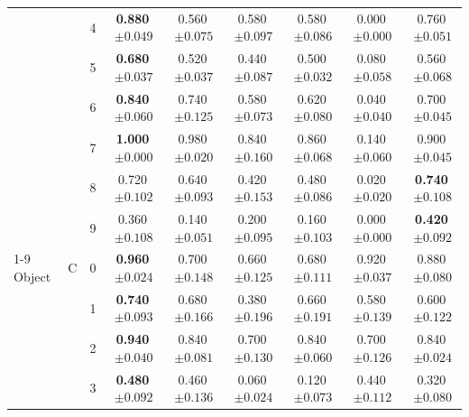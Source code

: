 \begin{longtable}{lllcccccc}
 &  & 4 & \textbf{0.880}$\,{\scriptstyle\pm0.049}$ & 0.560$\,{\scriptstyle\pm0.075}$ & 0.580$\,{\scriptstyle\pm0.097}$ & 0.580$\,{\scriptstyle\pm0.086}$ & 0.000$\,{\scriptstyle\pm0.000}$ & 0.760$\,{\scriptstyle\pm0.051}$ \\
 &  & 5 & \textbf{0.680}$\,{\scriptstyle\pm0.037}$ & 0.520$\,{\scriptstyle\pm0.037}$ & 0.440$\,{\scriptstyle\pm0.087}$ & 0.500$\,{\scriptstyle\pm0.032}$ & 0.080$\,{\scriptstyle\pm0.058}$ & 0.560$\,{\scriptstyle\pm0.068}$ \\
 &  & 6 & \textbf{0.840}$\,{\scriptstyle\pm0.060}$ & 0.740$\,{\scriptstyle\pm0.125}$ & 0.580$\,{\scriptstyle\pm0.073}$ & 0.620$\,{\scriptstyle\pm0.080}$ & 0.040$\,{\scriptstyle\pm0.040}$ & 0.700$\,{\scriptstyle\pm0.045}$ \\
 &  & 7 & \textbf{1.000}$\,{\scriptstyle\pm0.000}$ & 0.980$\,{\scriptstyle\pm0.020}$ & 0.840$\,{\scriptstyle\pm0.160}$ & 0.860$\,{\scriptstyle\pm0.068}$ & 0.140$\,{\scriptstyle\pm0.060}$ & 0.900$\,{\scriptstyle\pm0.045}$ \\
 &  & 8 & 0.720$\,{\scriptstyle\pm0.102}$ & 0.640$\,{\scriptstyle\pm0.093}$ & 0.420$\,{\scriptstyle\pm0.153}$ & 0.480$\,{\scriptstyle\pm0.086}$ & 0.020$\,{\scriptstyle\pm0.020}$ & \textbf{0.740}$\,{\scriptstyle\pm0.108}$ \\
 &  & 9 & 0.360$\,{\scriptstyle\pm0.108}$ & 0.140$\,{\scriptstyle\pm0.051}$ & 0.200$\,{\scriptstyle\pm0.095}$ & 0.160$\,{\scriptstyle\pm0.103}$ & 0.000$\,{\scriptstyle\pm0.000}$ & \textbf{0.420}$\,{\scriptstyle\pm0.092}$ \\
\cmidrule(lr){1-9}
Object & C & 0 & \textbf{0.960}$\,{\scriptstyle\pm0.024}$ & 0.700$\,{\scriptstyle\pm0.148}$ & 0.660$\,{\scriptstyle\pm0.125}$ & 0.680$\,{\scriptstyle\pm0.111}$ & 0.920$\,{\scriptstyle\pm0.037}$ & 0.880$\,{\scriptstyle\pm0.080}$ \\
 &  & 1 & \textbf{0.740}$\,{\scriptstyle\pm0.093}$ & 0.680$\,{\scriptstyle\pm0.166}$ & 0.380$\,{\scriptstyle\pm0.196}$ & 0.660$\,{\scriptstyle\pm0.191}$ & 0.580$\,{\scriptstyle\pm0.139}$ & 0.600$\,{\scriptstyle\pm0.122}$ \\
 &  & 2 & \textbf{0.940}$\,{\scriptstyle\pm0.040}$ & 0.840$\,{\scriptstyle\pm0.081}$ & 0.700$\,{\scriptstyle\pm0.130}$ & 0.840$\,{\scriptstyle\pm0.060}$ & 0.700$\,{\scriptstyle\pm0.126}$ & 0.840$\,{\scriptstyle\pm0.024}$ \\
 &  & 3 & \textbf{0.480}$\,{\scriptstyle\pm0.092}$ & 0.460$\,{\scriptstyle\pm0.136}$ & 0.060$\,{\scriptstyle\pm0.024}$ & 0.120$\,{\scriptstyle\pm0.073}$ & 0.440$\,{\scriptstyle\pm0.112}$ & 0.320$\,{\scriptstyle\pm0.080}$ \\

\end{longtable}

